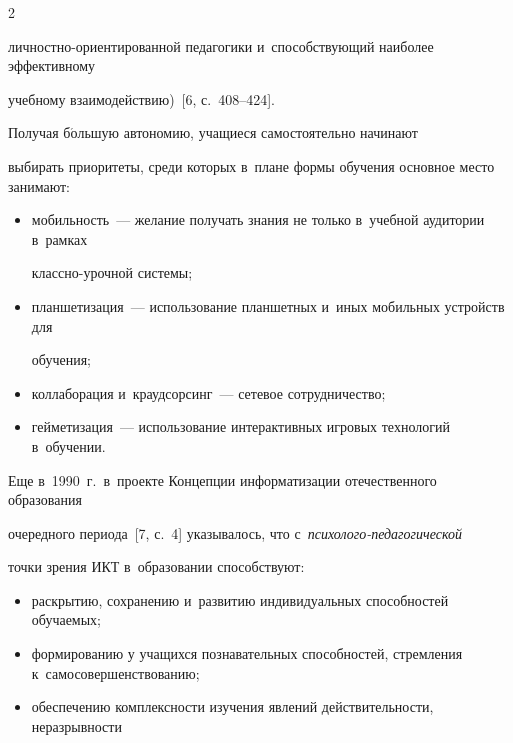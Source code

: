 \begin{multicols}{2}
\begin{itemize}
личностно-ори\-ен\-ти\-ро\-ван\-ной педагогики и~спо\-соб\-ст\-ву\-ющий наиболее эффективному


учебному взаимодей\-ствию)~[6, с.~408--424].


\end{itemize}





  Получая б$\acute{\mbox{о}}$льшую автономию, учащиеся самостоятельно начинают


выбирать приоритеты, среди которых в~плане формы обучения основное место занимают:


  \begin{itemize}


\item мобильность~--- желание получать знания не только в~учебной аудитории в~рамках


классно-уроч\-ной системы;


\item планшетизация~--- использование планшетных и~иных мобильных устройств для


обучения;


\item коллаборация и~краудсорсинг~--- сетевое сотрудничество;


\item гейметизация~--- использование интерактивных игровых технологий в~обучении.


\end{itemize}





  Еще в~1990~г.\ в~проекте Концепции информатизации отечественного образования


очередного периода~[7, с.~4] указывалось, что с~\textit{пси\-хо\-ло\-го-пе\-да\-го\-ги\-че\-ской}


точки зрения ИКТ в~образовании способствуют:


  \begin{itemize}


\item раскрытию, сохранению и~развитию индивидуальных способностей обучаемых;


\item формированию у учащихся познавательных способностей, стремления к~самосовершенствованию;


\item обеспечению комплексности изучения явлений действительности, неразрывности



\end{itemize}
\end{multicols}
